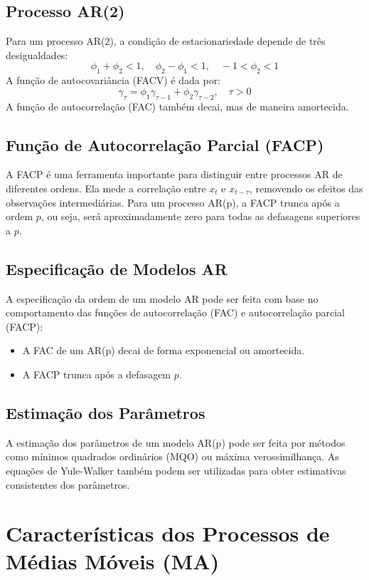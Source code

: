 \documentclass{sciposter}
\begin{document}
\begin{multicols}{3}
\subsection{Processo AR(2)}
Para um processo AR(2), a condição de estacionariedade depende de três desigualdades:
\[
\phi_1 + \phi_2 < 1, \quad \phi_2 - \phi_1 < 1, \quad -1 < \phi_2 < 1
\]
A função de autocovariância (FACV) é dada por:
\[
\gamma_\tau = \phi_1 \gamma_{\tau-1} + \phi_2 \gamma_{\tau-2}, \quad \tau > 0
\]
A função de autocorrelação (FAC) também decai, mas de maneira amortecida.

\subsection{Função de Autocorrelação Parcial (FACP)}
A FACP é uma ferramenta importante para distinguir entre processos AR de diferentes ordens. Ela mede a correlação entre $x_t$ e $x_{t-\tau}$, removendo os efeitos das observações intermediárias. Para um processo AR(p), a FACP trunca após a ordem $p$, ou seja, será aproximadamente zero para todas as defasagens superiores a $p$.

\subsection{Especificação de Modelos AR}
A especificação da ordem de um modelo AR pode ser feita com base no comportamento das funções de autocorrelação (FAC) e autocorrelação parcial (FACP):
\begin{itemize}
    \item A FAC de um AR(p) decai de forma exponencial ou amortecida.
    \item A FACP trunca após a defasagem $p$.
\end{itemize}

\subsection{Estimação dos Parâmetros}
A estimação dos parâmetros de um modelo AR(p) pode ser feita por métodos como mínimos quadrados ordinários (MQO) ou máxima verossimilhança. As equações de Yule-Walker também podem ser utilizadas para obter estimativas consistentes dos parâmetros.

\section{\textbf{Características dos Processos de Médias Móveis (MA)}}


\end{multicols}
\end{document}
